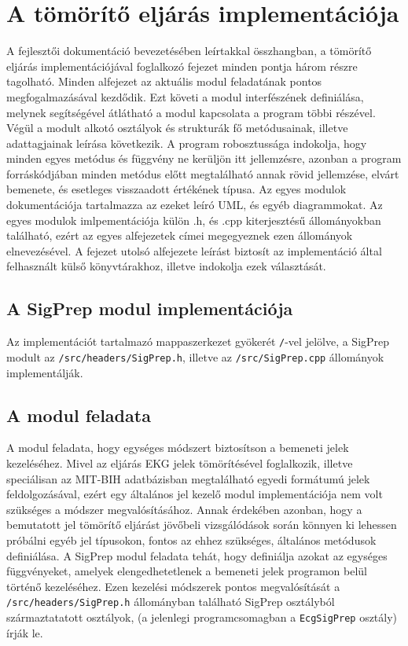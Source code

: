 \documentclass[oneside,titlepage,12pt,a4paper]{report}
\begin{document}
\section{A tömörítő eljárás implementációja} \label{sec::modimpl}

A fejlesztői dokumentáció bevezetésében leírtakkal összhangban, a tömörítő eljárás implementációjával foglalkozó fejezet minden pontja három részre tagolható. Minden alfejezet az aktuális modul feladatának pontos megfogalmazásával kezdődik. Ezt követi a modul interfészének definiálása, melynek segítségével átlátható a modul kapcsolata a program többi részével. Végül a modult alkotó osztályok és strukturák fő metódusainak, illetve adattagjainak leírása következik. A program robosztussága indokolja, hogy minden egyes metódus és függvény ne kerüljön itt jellemzésre, azonban a program forráskódjában minden metódus előtt megtalálható annak rövid jellemzése, elvárt bemenete, és esetleges visszaadott értékének típusa. Az egyes modulok dokumentációja tartalmazza az ezeket leíró UML, és egyéb diagrammokat. Az egyes modulok imlpementációja külön .h, és .cpp kiterjesztésű állományokban található, ezért az egyes alfejezetek címei megegyeznek ezen állományok elnevezésével. A fejezet utolsó alfejezete leírást biztosít az implementáció által felhasznált külső könyvtárakhoz, illetve indokolja ezek választását.

\subsection{A SigPrep modul implementációja} \label{subsec::SigPrep}

Az implementációt tartalmazó mappaszerkezet gyökerét \texttt{/}-vel jelölve, a SigPrep modult  az \texttt{/src/headers/SigPrep.h}, illetve az \texttt{/src/SigPrep.cpp} állományok implementálják. 

\subsection*{A modul feladata}

\par A modul feladata, hogy egységes módszert biztosítson a bemeneti jelek kezeléséhez. 
Mivel az eljárás EKG jelek tömörítésével foglalkozik, illetve speciálisan az MIT-BIH adatbázisban megtalálható egyedi formátumú jelek feldolgozásával, 
ezért egy általános jel kezelő modul implementációja nem volt szükséges a módszer megvalósításához. Annak érdekében azonban, 
hogy a bemutatott jel tömörítő eljárást jövőbeli vizsgálódások során könnyen ki lehessen próbálni egyéb jel típusokon, fontos az ehhez szükséges, általános metódusok definiálása. A SigPrep modul feladata tehát, hogy definiálja azokat az egységes függvényeket, amelyek elengedhetetlenek a bemeneti jelek programon belül történő kezeléséhez. Ezen kezelési módszerek pontos megvalósítását a \texttt{/src/headers/SigPrep.h} állományban található SigPrep osztályból származtatatott osztályok, (a jelenlegi programcsomagban a \texttt{EcgSigPrep} osztály) írják le. 
\end{document}
